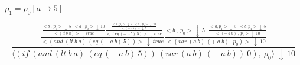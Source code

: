 \documentclass[11pt]{article}
\begin{document}
\begin{enumerate}
        \begin{math}
            \rho_1 = \rho_0[a \mapsto 5]
        \end{math}

        \[
            \frac
            {
                \frac
                {
                    \frac
                    {
                        <b \ , \ p_0>\ \downarrow \ 5
                    \ \ \
                        <a \ , \ p_0> \ \downarrow \ 10
                    }
                    {<(lt\ b\ a)> \ \downarrow \ true}
                    \frac
                    {
                        \frac
                        {
                            <b \ , \ p_0>\ \downarrow \ 5
                        \ \ \
                            <a \ , \ p_0> \ \downarrow \ 10
                        }
                        {<(-\ a\ b)> \ \downarrow \ 5}
                    }
                    {<(eq\ (-\ a\ b)\ 5)> \ \downarrow \ true}
                }
                {
                    <(and\ (lt\ b\ a)\ (eq\ (-\ a\ b)\ 5))> \ \downarrow \ true
                }
                \frac
                {
                    <b \ , \ p_0> \ \downarrow \ 5
                \ \ \
                    \frac
                    {<a , p_1>\ \downarrow \ 5 \ \ \ <b , p_1> \ \downarrow \ 5}
                    {<(+\ a\ b) \ , \ p_1> \ \downarrow \ 10}
                }
                {<(var\ (a\ b)\ (+\ a\ b), \ p_0)> \ \downarrow \ 10}
            }
            {\langle (if\ (and\ (lt\ b\ a)\ (eq\ (-\ a\ b)\ 5))\ (var\ (a\ b)\ (+\ a\ b))\ 0),\ \rho_0 \rangle \ \downarrow \ 10}
        \]

    \end{enumerate}
\end{document}
